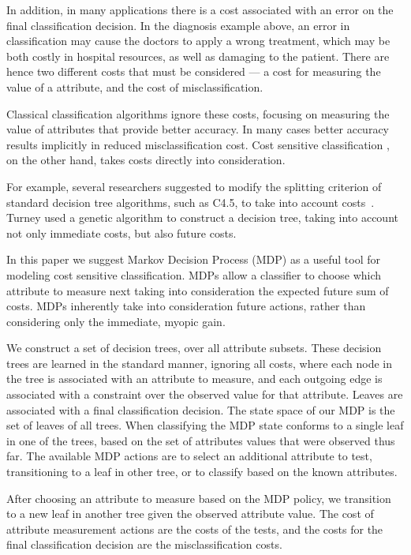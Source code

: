 \documentclass[letterpaper]{article}
\theoremstyle{definition}
\begin{document}
In addition, in many applications there is a cost associated with an error on the final classification decision. In the diagnosis example above, an error in classification may cause the doctors to apply a wrong treatment, which may be both costly in hospital resources, as well as damaging to the patient. There are hence two different costs that must be considered ---  a cost for measuring the value of a attribute, and the cost of misclassification.

Classical classification algorithms ignore these costs, focusing on measuring the value of attributes that provide better accuracy. In many cases better accuracy results implicitly in reduced misclassification cost.
Cost sensitive classification \cite{elkan2001foundations,turney1995cost,LomaxV13}, on the other hand, takes costs directly into consideration.

For example, several researchers suggested to modify the splitting criterion of standard decision tree algorithms, such as C4.5, to take into account costs~\cite{CS-IDS3,IDX,EG2}. Turney  used a genetic algorithm to construct a decision tree, taking into account not only immediate costs, but also future costs.

In this paper we suggest Markov Decision Process (MDP) \cite{Bellman,Puterman} as a useful tool for modeling cost sensitive classification. MDPs allow a classifier to choose which attribute to measure next taking into consideration the expected future sum of costs. MDPs inherently take into consideration future actions, rather than considering only the immediate, myopic gain.

We construct a set of decision trees, over all attribute subsets. These decision trees are learned in the standard manner, ignoring all costs, where each node in the tree is associated with an attribute to measure, and each outgoing edge is associated with a constraint over the observed value for that attribute. Leaves are associated with a final classification decision. The state space of our MDP is the set of leaves of all trees.
When classifying the MDP state conforms to a single leaf in one of the trees, based on the set of attributes values that were observed thus far.
The available MDP actions are to select an additional attribute to test, transitioning to a leaf in other tree, or to classify based on the known attributes.

After choosing an attribute to measure based on the MDP policy, we transition to a new leaf in another tree given the observed attribute value. The cost of attribute measurement actions are the costs of the tests, and the costs for the final classification decision are the misclassification costs.
\end{document}
